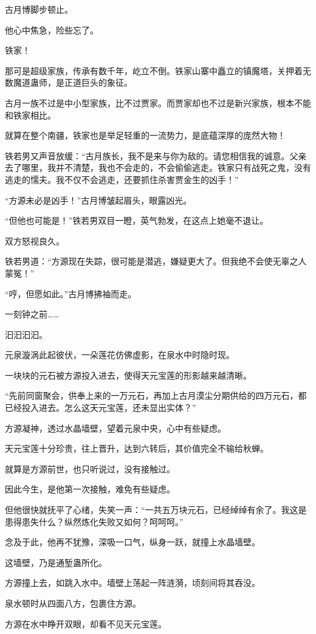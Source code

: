 \begin{this_body}
古月博脚步顿止。

他心中焦急，险些忘了。

铁家！

那可是超级家族，传承有数千年，屹立不倒。铁家山寨中矗立的镇魔塔，关押着无数魔道蛊师，是正道巨头的象征。

古月一族不过是中小型家族，比不过贾家。而贾家却也不过是新兴家族，根本不能和铁家相比。

就算在整个南疆，铁家也是举足轻重的一流势力，是底蕴深厚的庞然大物！

铁若男又声音放缓：“古月族长，我不是来与你为敌的。请您相信我的诚意。父亲去了哪里，我并不清楚，我也不会走的，不会偷偷逃走。铁家只有战死之鬼，没有逃走的懦夫。我不仅不会逃走，还要抓住杀害贾金生的凶手！”

“方源未必是凶手！”古月博皱起眉头，眼露凶光。

“但他也可能是！”铁若男双目一瞪，英气勃发，在这点上她毫不退让。

双方怒视良久。

铁若男道：“方源现在失踪，很可能是潜逃，嫌疑更大了。但我绝不会使无辜之人蒙冤！”

“哼，但愿如此。”古月博拂袖而走。

一刻钟之前……

汩汩汩汩。

元泉漩涡此起彼伏，一朵莲花仿佛虚影，在泉水中时隐时现。

一块块的元石被方源投入进去，使得天元宝莲的形影越来越清晰。

“先前同窗聚会，供奉上来的一万元石，再加上古月漠尘分期供给的四万元石，都已经投入进去。怎么这天元宝莲，还未显出实体？”

方源凝神，透过水晶墙壁，望着元泉中央，心中有些疑虑。

天元宝莲十分珍贵，往上晋升，达到六转后，其价值完全不输给秋蝉。

就算是方源前世，也只听说过，没有接触过。

因此今生，是他第一次接触，难免有些疑虑。

但他很快就抚平了心绪，失笑一声：“一共五万块元石，已经绰绰有余了。我这是患得患失什么？纵然炼化失败又如何？呵呵呵。”

念及于此，他再不犹豫，深吸一口气，纵身一跃，就撞上水晶墙壁。

这墙壁，乃是通堑蛊所化。

方源撞上去，如跳入水中。墙壁上荡起一阵涟漪，顷刻间将其吞没。

泉水顿时从四面八方，包裹住方源。

方源在水中睁开双眼，却看不见天元宝莲。


\end{this_body}
